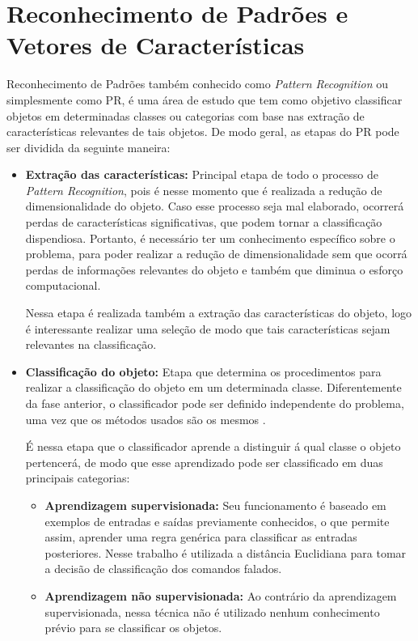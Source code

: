 \documentclass[a4paper,12pt,twoside,openright]{report}
\begin{document}
\section{Reconhecimento de Padr\~{o}es e Vetores de Caracter\'{i}sticas}
\label{reconhecimento_padroes_vetores_caracteristicas}

\par Reconhecimento de Padr\~{o}es tamb\'{e}m conhecido como \textit{Pattern Recognition} ou simplesmente como PR, \'{e} uma \'{a}rea de estudo que tem como objetivo classificar objetos em determinadas classes ou categorias com base nas extra{\c c}\~{a}o de caracter\'{i}sticas relevantes de tais objetos. De modo geral, as etapas do PR pode ser dividida da seguinte maneira:

\begin{itemize}
	
	\item{
		\textbf{Extra{\c c}\~{a}o das caracter\'{i}sticas:} Principal etapa de todo o processo de \textit{Pattern Recognition}, pois \'{e} nesse momento que \'{e} realizada a redu{\c c}\~{a}o de dimensionalidade do objeto. Caso esse processo seja mal elaborado, ocorrer\'{a} perdas de caracter\'{i}sticas significativas, que podem tornar a classifica{\c c}\~{a}o dispendiosa. Portanto, \'{e} necess\'{a}rio ter um conhecimento espec\'{i}fico sobre o problema, para poder realizar a redu{\c c}\~{a}o de dimensionalidade sem que ocorr\'{a} perdas de informa{\c c}\~{o}es relevantes do objeto e tamb\'{e}m que diminua o esfor{\c c}o computacional. 
		\par Nessa etapa \'{e} realizada tamb\'{e}m a extra{\c c}\~{a}o das caracter\'{i}sticas do objeto, logo \'{e} interessante realizar uma sele{\c c}\~{a}o de modo que tais caracter\'{i}sticas sejam relevantes na classifica{\c c}\~{a}o.
	}		 
	
	\item{
		\textbf{Classifica{\c c}\~{a}o do objeto:} Etapa que determina os procedimentos para realizar a classifica{\c c}\~{a}o do objeto em um determinada classe. Diferentemente da fase anterior, o classificador pode ser definido independente do problema, uma vez que os m\'{e}todos usados s\~{a}o os mesmos .
		\par\'{E} nessa etapa que o classificador aprende a distinguir \'{a} qual classe o objeto pertencer\'{a}, de modo que esse aprendizado pode ser classificado em duas principais categorias:
		
		\begin{itemize}
			\item \textbf{Aprendizagem supervisionada:} Seu funcionamento \'{e} baseado em exemplos de entradas e sa\'{i}das previamente conhecidos, o que permite assim, aprender uma regra gen\'{e}rica para classificar as entradas posteriores. Nesse trabalho \'{e} utilizada a dist\^{a}ncia Euclidiana para tomar a decis\~{a}o de classifica{\c c}\~{a}o dos comandos falados.
			\item \textbf{Aprendizagem n\~{a}o supervisionada:} Ao contr\'{a}rio da aprendizagem supervisionada, nessa t\'{e}cnica n\~{a}o \'{e} utilizado nenhum conhecimento pr\'{e}vio para se classificar os objetos.
		\end{itemize}
}	
\end{itemize}
\end{document}
